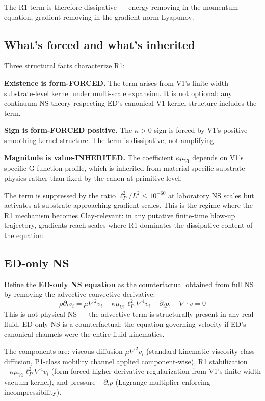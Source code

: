 \documentclass[11pt,a4paper]{article}
\begin{document}
The R1 term is therefore dissipative --- energy-removing in the momentum equation, gradient-removing in the gradient-norm Lyapunov.

\subsection{What's forced and what's inherited}

Three structural facts characterize R1:

\textbf{Existence is form-FORCED.} The term arises from V1's finite-width substrate-level kernel under multi-scale expansion. It is not optional: any continuum NS theory respecting ED's canonical V1 kernel structure includes the term.

\textbf{Sign is form-FORCED positive.} The $\kappa > 0$ sign is forced by V1's positive-smoothing-kernel structure. The term is dissipative, not amplifying.

\textbf{Magnitude is value-INHERITED.} The coefficient $\kappa\mu_{V1}$ depends on V1's specific G-function profile, which is inherited from material-specific substrate physics rather than fixed by the canon at primitive level.

The term is suppressed by the ratio $\ell_P^2 / L^2 \leq 10^{-60}$ at laboratory NS scales but activates at substrate-approaching gradient scales. This is the regime where the R1 mechanism becomes Clay-relevant: in any putative finite-time blow-up trajectory, gradients reach scales where R1 dominates the dissipative content of the equation.

\subsection{ED-only NS}

Define the \textbf{ED-only NS equation} as the counterfactual obtained from full NS by removing the advective convective derivative:
\[
\rho\partial_t v_i = \mu\nabla^2 v_i - \kappa\mu_{V1}\ell_P^2\nabla^4 v_i - \partial_i p, \quad \nabla\cdot v = 0
\]
This is not physical NS --- the advective term is structurally present in any real fluid. ED-only NS is a counterfactual: the equation governing velocity if ED's canonical channels were the entire fluid kinematics.

The components are: viscous diffusion $\mu\nabla^2 v_i$ (standard kinematic-viscosity-class diffusion, P1-class mobility channel applied component-wise), R1 stabilization $-\kappa\mu_{V1}\ell_P^2\nabla^4 v_i$ (form-forced higher-derivative regularization from V1's finite-width vacuum kernel), and pressure $-\partial_i p$ (Lagrange multiplier enforcing incompressibility).
\end{document}
